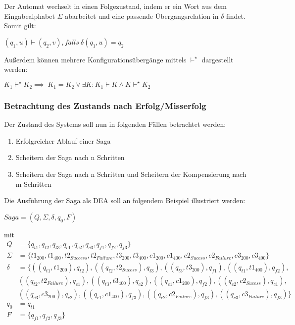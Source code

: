 Der Automat wechselt in einen Folgezustand, indem er ein Wort aus dem Eingabealphabet $\Sigma$ abarbeitet und eine passende Übergangsrelation in $\delta$ findet. Somit gilt:

\begin{center}
$(q_{1}, u)\vdash (q_{2}, v), falls\ \delta(q_{1}, u) = q_{2}$
\end{center}

Außerdem können mehrere Konfigurationsübergänge mittels $\vdash^{\star}$ dargestellt werden:

\begin{center}
$K_1 \vdash^{\star} K_2 \implies \ K_1 = K_2 \lor \exists K: K_1 \vdash K \land K \vdash^{\star} K_2$
\end{center}

\subsubsection{Betrachtung des Zustands nach Erfolg/Misserfolg}
Der Zustand des Systems soll nun in folgenden Fällen betrachtet werden:
\begin{enumerate}%
	\item Erfolgreicher Ablauf einer Saga
	\item Scheitern der Saga nach n Schritten
	\item Scheitern der Saga nach n Schritten und Scheitern der Kompensierung nach m Schritten
\end{enumerate}

Die Ausführung der Saga als DEA soll an folgendem Beispiel illustriert werden:


$Saga = (Q, \Sigma, \delta, q_0, F)$

mit
\begin{align*}
Q &= \{q_{t1}, q_{t2}, q_{t3}, q_{c1}, q_{c2}, q_{c3}, q_{f1}, q_{f2}, q_{f3}\}\\
\Sigma &= \{t1_{200}, t1_{400}, t2_{Success}, t2_{Failure}, t3_{200}, t3_{400}, c1_{200}, c1_{400}, c2_{Sucess}, c2_{Failure}, c3_{200}, c3_{400}\}\\
\delta &= \{((q_{t1}, t1_{200}), q_{t2}), 
((q_{t2}, t2_{Sucess}), q_{t3}), 
((q_{t3}, t3_{200}), q_{f1}), 
((q_{t1}, t1_{400}), q_{f2}), \\
&((q_{t2}, t2_{Failure}), q_{c1}), 
((q_{t3}, t3_{400}), q_{c2}), 
((q_{c1}, c1_{200}), q_{f2}), 
((q_{c2}, c2_{Sucess}), q_{c1}),\\ 
&((q_{c3}, c3_{200}), q_{c2}), 
((q_{c1}, c1_{400}), q_{f3}), 
((q_{c2}, c2_{Failure}), q_{f3}), 
((q_{c3}, c3_{Failure}), q_{f3})\} \\
q_0 &= q_{t1}\\
F &= \{q_{f1}, q_{f2}, q_{f3}\}
\end{align*}


